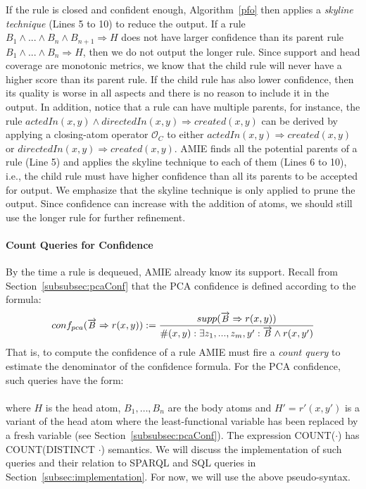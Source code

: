 If the rule is closed and confident enough, Algorithm~\ref{pfo} then applies a \emph{skyline technique} (Lines 5 to 10)
to reduce the output. If a rule $B_1 \wedge ... \wedge B_n \wedge B_{n+1} \Rightarrow H$ does not have larger confidence
than its parent rule $B_1 \wedge ... \wedge B_n \Rightarrow H$, then we do not output the longer rule.
Since support and head coverage are monotonic metrics, we know that the child rule will never have a higher score than its parent rule. 
If the child rule has also lower confidence, then its quality is worse in all aspects and there is 
no reason to include it in the output.
In addition, notice that a rule can have multiple parents, for instance, the rule $actedIn(x,y) \wedge directedIn(x,y) \Rightarrow created(x,y)$
can be derived by applying a closing-atom operator $\mathcal{O}_C$ to either $actedIn(x,y) \Rightarrow created(x,y)$ or
$directedIn(x,y) \Rightarrow created(x,y)$. AMIE
finds all the potential parents of a rule (Line 5) and applies the skyline technique to each of them (Lines 6 to 10), i.e., the child
rule must have higher confidence than all its parents to be accepted for output.
We emphasize that the skyline technique is only applied to prune the output. 
Since confidence can increase with the addition of atoms, we should still use the longer rule 
for further refinement.

\paragraph{Count Queries for Confidence} \label{countQueries} By the time a rule is dequeued, AMIE already know its support. 
Recall from Section~\ref{subsubsec:pcaConf} that the PCA confidence is defined according to the formula:
\[
\begin{small}
conf_{pca}(\vec{B} \Rightarrow r(x,y)) := \frac{supp(\vec{B} \Rightarrow r(x,y))}{\#(x,y): \exists z_1,...,z_m,y': \vec{B} \wedge r(x,y')}
\end{small}
\]
That is, to compute the confidence of a rule AMIE must fire a \emph{count query} to estimate the denominator
of the confidence formula. For the PCA confidence, such queries have the form: \\

 \\

\noindent where $H$ is the head atom, $B_1, \dots, B_n$ are the body atoms and $H'= r'(x,y')$ is a variant of the
head atom where the least-functional variable has been replaced by a fresh variable (see Section~\ref{subsubsec:pcaConf}).
The expression COUNT($\cdot$) has COUNT(DISTINCT $\cdot$) semantics.
We will discuss the implementation of such queries and their relation to SPARQL and SQL queries in Section~\ref{subsec:implementation}. 
For now, we will use the above pseudo-syntax.

